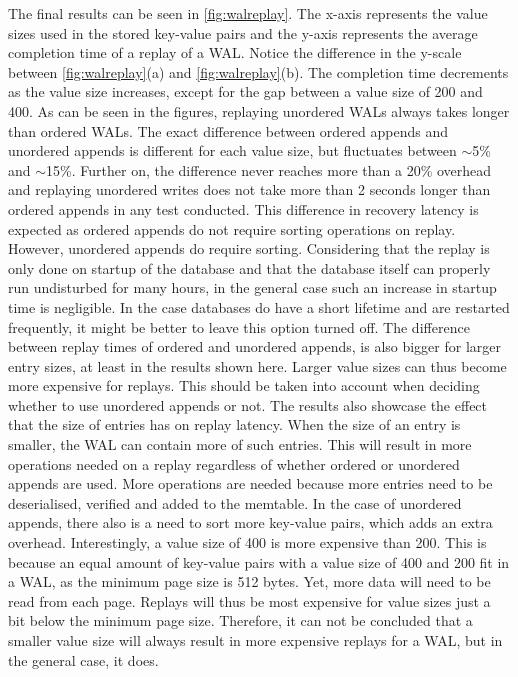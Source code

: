 The final results can be seen in \autoref{fig:walreplay}. The x-axis represents the value sizes used in the stored key-value pairs and the y-axis represents the average completion time of a replay of a WAL. Notice the difference in the y-scale between \autoref{fig:walreplay}(a) and \autoref{fig:walreplay}(b). The completion time decrements as the value size increases, except for the gap between a value size of 200 and 400. As can be seen in the figures, replaying unordered WALs always takes longer than ordered WALs. The exact difference between ordered appends and unordered appends is different for each value size, but fluctuates between $\sim$5\% and $\sim$15\%.  Further on, the difference never reaches more than a 20\% overhead and replaying unordered writes does not take more than 2 seconds longer than ordered appends in any test conducted. This difference in recovery latency is expected as ordered appends do not require sorting operations on replay. However, unordered appends do require sorting. Considering that the replay is only done on startup of the database and that the database itself can properly run undisturbed for many hours, in the general case such an increase in startup time is negligible. In the case databases do have a short lifetime and are restarted frequently, it might be better to leave this option turned off. The difference between replay times of ordered and unordered appends, is also bigger for larger entry sizes, at least in the results shown here. Larger value sizes can thus become more expensive for replays. This should be taken into account when deciding whether to use unordered appends or not. The results also showcase the effect that the size of entries has on replay latency. When the size of an entry is smaller, the WAL can contain more of such entries. This will result in more operations needed on a replay regardless of whether ordered or unordered appends are used. More operations are needed because more entries need to be deserialised, verified and added to the memtable. In the case of unordered appends, there also is a need to sort more key-value pairs, which adds an extra overhead. Interestingly, a value size of 400 is more expensive than 200. This is because an equal amount of key-value pairs with a value size of 400 and 200 fit in a WAL, as the minimum page size is 512 bytes. Yet, more data will need to be read from each page. Replays will thus be most expensive for value sizes just a bit below the minimum page size. Therefore, it can not be concluded that a smaller value size will always result in more expensive replays for a WAL, but in the general case, it does. 

